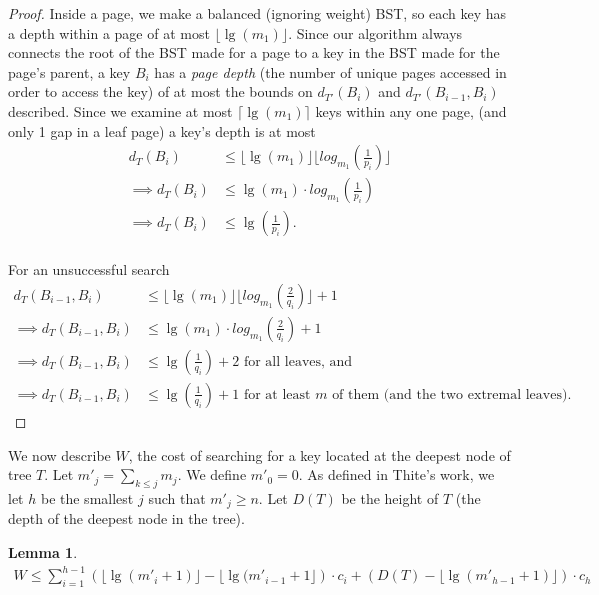 \documentclass[]{beamer}
\theoremstyle{plain}
\newtheorem{lem}[thm]{Lemma}
\begin{document}
\begin{frame}
\begin{proof}
Inside a page, we make a balanced (ignoring weight) BST, so each key has a depth within a page of at most $\lfloor \lg(m_1) \rfloor$. Since our algorithm always connects the root of the BST made for a page to a key in the BST made for the page's parent, a key $B_i$ has a \textit{page depth} (the number of unique pages accessed in order to access the key) of at most the bounds on $d_{T'}(B_i)$ and $d_{T'}(B_{i-1},B_i)$ described. Since we examine at most $\lceil \lg(m_1) \rceil$ keys within any one page, (and only 1 gap in a leaf page) a key's depth is at most
\begin{align*}
d_T(B_i) &\leq \lfloor \lg(m_1) \rfloor \lfloor log_{m_1}(\frac{1}{p_i}) \rfloor \\
\implies d_T(B_i) &\leq \lg(m_1)\cdot log_{m_1}(\frac{1}{p_i}) \\
\implies d_T(B_i) &\leq \lg(\frac{1}{p_i}). \\
\end{align*}

\noindent For an unsuccessful search
\begin{align*}
d_T(B_{i-1},B_i) &\leq \lfloor \lg(m_1) \rfloor \lfloor log_{m_1}(\frac{2}{q_i}) \rfloor + 1 \\
\implies d_T(B_{i-1},B_i) &\leq \lg(m_1)\cdot log_{m_1}(\frac{2}{q_i}) + 1 \\
\implies d_T(B_{i-1},B_i) &\leq \lg(\frac{1}{q_i}) + 2 \text{ for all leaves, and} \\
\implies d_T(B_{i-1},B_i) &\leq \lg(\frac{1}{q_i}) + 1 \text{ for at least $m$ of them (and the two extremal leaves)}.
\end{align*}


\end{proof}

We now describe $W$, the cost of searching for a key located at the deepest node of tree $T$. Let $m'_j = \sum_{k \leq j} m_j$. We define $m'_0 = 0$. As defined in Thite's work, we let $h$ be the smallest $j$ such that $m'_j \geq n$. Let $D(T)$ be the height of $T$ (the depth of the deepest node in the tree).


\begin{lem} \label{452}
\begin{align*}
W \leq \sum_{i=1}^{h-1} \left(\lfloor \lg(m'_i+1) \rfloor - \lfloor \lg(m'_{i-1}+1 \rfloor  \right)\cdot c_i+ \left(D(T) - \lfloor \lg(m'_{h-1}+1) \rfloor \right)\cdot c_h
\end{align*}
\end{lem}



\end{frame}
\end{document}
